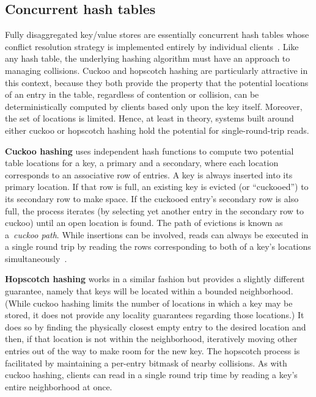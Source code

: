 \subsection{Concurrent hash tables} 
\label{sec:cuckoo-back}

Fully disaggregated key/value stores are essentially concurrent hash
tables whose conflict resolution strategy is implemented entirely by
individual clients~\cite{rolex,fusee,race}.  Like any hash table, the
underlying hashing algorithm must have an approach to managing
collisions. Cuckoo and hopscotch hashing are particularly attractive
in this context, because they both provide the property that the
potential locations of an entry in the table, regardless of
contention or collision, can be deterministically computed by clients
based only upon the key itself.  Moreover, the set of locations is
limited.  Hence, at least in theory, systems built around either
cuckoo or hopscotch hashing hold the potential for single-round-trip
reads.


\textbf{Cuckoo hashing} uses independent hash functions to compute two
potential table locations for a key, a primary and a secondary, where
each location corresponds to an associative row of entries.  A key is
always inserted into its primary location.  If that row is full, an
existing key is evicted (or ``cuckooed'') to its secondary row to make
space. If the cuckooed entry's secondary row is also full, the process
iterates (by selecting yet another entry in the secondary row to
cuckoo) until an open location is found. The path of evictions is
known as a~\textit{cuckoo path}.  While insertions can be involved,
reads can always be executed in a single round trip by reading the
rows corresponding to both of a key's locations
simultaneously~\cite{pilaf}.

\textbf{Hopscotch hashing} works in a similar fashion but provides a
slightly different guarantee, namely that keys will be located within
a bounded neighborhood.  (While cuckoo hashing limits the number of
locations in which a key may be stored, it does not provide any
locality guarantees regarding those locations.) It does so by finding
the physically closest empty entry to the desired location and then,
if that location is not within the neighborhood, iteratively
moving other entries out of the way to make room for the new key.
The hopscotch process is facilitated by maintaining a per-entry
bitmask of nearby collisions.  As with cuckoo hashing, clients can read in a single round trip time by reading a key's entire
neighborhood at once.

